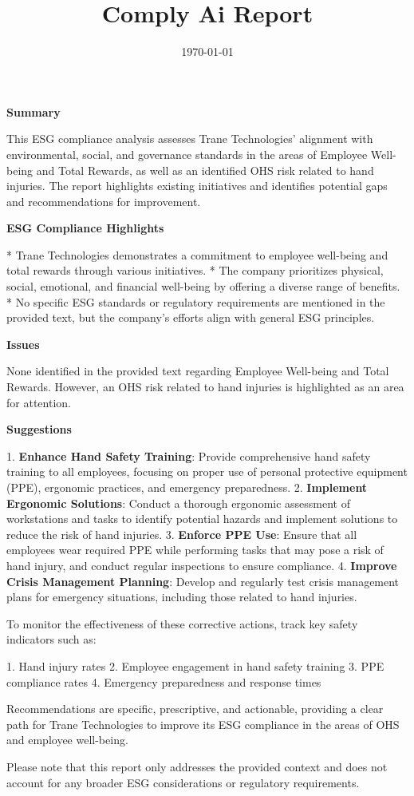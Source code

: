 \documentclass{article}
\title{Comply Ai Report}
\date{\today}
\begin{document}
                \maketitle

                \textbf{Summary}

This ESG compliance analysis assesses Trane Technologies' alignment with environmental, social, and governance standards in the areas of Employee Well-being and Total Rewards, as well as an identified OHS risk related to hand injuries. The report highlights existing initiatives and identifies potential gaps and recommendations for improvement.

\textbf{ESG Compliance Highlights}

* Trane Technologies demonstrates a commitment to employee well-being and total rewards through various initiatives.
* The company prioritizes physical, social, emotional, and financial well-being by offering a diverse range of benefits.
* No specific ESG standards or regulatory requirements are mentioned in the provided text, but the company's efforts align with general ESG principles.

\textbf{Issues}

None identified in the provided text regarding Employee Well-being and Total Rewards. However, an OHS risk related to hand injuries is highlighted as an area for attention.

\textbf{Suggestions}

1. \textbf{Enhance Hand Safety Training}: Provide comprehensive hand safety training to all employees, focusing on proper use of personal protective equipment (PPE), ergonomic practices, and emergency preparedness.
2. \textbf{Implement Ergonomic Solutions}: Conduct a thorough ergonomic assessment of workstations and tasks to identify potential hazards and implement solutions to reduce the risk of hand injuries.
3. \textbf{Enforce PPE Use}: Ensure that all employees wear required PPE while performing tasks that may pose a risk of hand injury, and conduct regular inspections to ensure compliance.
4. \textbf{Improve Crisis Management Planning}: Develop and regularly test crisis management plans for emergency situations, including those related to hand injuries.

To monitor the effectiveness of these corrective actions, track key safety indicators such as:

1. Hand injury rates
2. Employee engagement in hand safety training
3. PPE compliance rates
4. Emergency preparedness and response times

Recommendations are specific, prescriptive, and actionable, providing a clear path for Trane Technologies to improve its ESG compliance in the areas of OHS and employee well-being.

Please note that this report only addresses the provided context and does not account for any broader ESG considerations or regulatory requirements.

                
\end{document}

